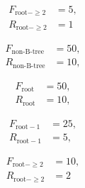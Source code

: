 \begin{frame}
\begin{description}
\begin{minipage}[t]{.225\linewidth}
\begin{align*}
                                F_{\text{root} - \geq 2} &= 5,\\
                                R_{\text{root} - \geq 2} &= 1
                            \end{align*}
                        \end{minipage}%
                        \vspace{-3em}
        \item<4->[x2]   \noindent\begin{minipage}[t]{.225\linewidth}
                            \vspace{-2em}
                            \begin{align*}
                                F_{\text{non-B-tree}} &= 50,\\
                                R_{\text{non-B-tree}} &= 10,
                            \end{align*}
                            \end{minipage}%
                        \noindent\begin{minipage}[t]{.225\linewidth}
                        \vspace{-2em}
                            \begin{align*}
                                F_{\text{root}} &= 50,\\
                                R_{\text{root}} &= 10,
                            \end{align*}\break
                        \end{minipage}%
                        \noindent\begin{minipage}[t]{.225\linewidth}
                            \vspace{-2em}
                            \begin{align*}
                                F_{\text{root} - 1} &= 25,\\
                                R_{\text{root} - 1} &= 5,
                            \end{align*}\break
                        \end{minipage}%
                        \noindent\begin{minipage}[t]{.225\linewidth}
                            \vspace{-2em}
                            \begin{align*}
                                F_{\text{root} - \geq 2} &= 10,\\
                                R_{\text{root} - \geq 2} &= 2
                            \end{align*}
                        \end{minipage}%
                        \vspace{-3em}
    \end{description}
\end{frame}

